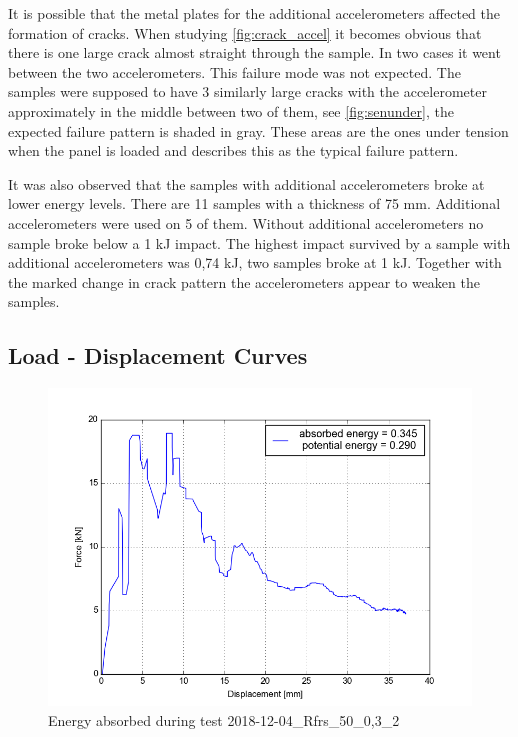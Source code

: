 It is possible that the metal plates for the additional accelerometers affected the formation of cracks. When studying \autoref{fig:crack_accel} it becomes obvious that there is one large crack almost straight through the sample. In two cases it went between the two accelerometers. This failure mode was not expected. The samples were supposed to have 3 similarly large cracks with the accelerometer approximately in the middle between two of them, see \autoref{fig:senunder}, the expected failure pattern is shaded in gray. These areas are the ones under tension when the panel is loaded and \autocite{c1550} describes this as the typical failure pattern. 

It was also observed that the samples with additional accelerometers broke at lower energy levels. There are 11 samples with a thickness of 75 mm. Additional accelerometers were used on 5 of them. Without additional accelerometers no sample broke below a 1 kJ impact. The highest impact survived by a sample with additional accelerometers was 0,74 kJ, two samples broke at 1 kJ. Together with the marked change in crack pattern the accelerometers appear to weaken the samples.


\subsection{Load - Displacement Curves}

\begin{figure}
    \centering
    \includegraphics[width=0.95 \linewidth]{pics/2018-12-04_Rfrs_50_0,3_2_energy.png}
    \caption{Energy absorbed during test 2018-12-04\_Rfrs\_50\_0,3\_2}
    \label{fig:energy1}
\end{figure}

